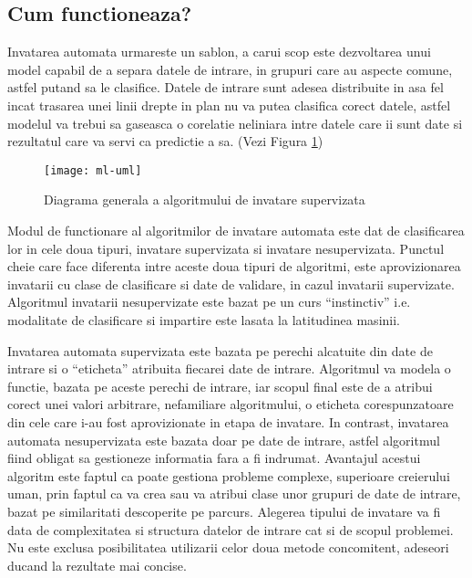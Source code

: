 	
	\subsection{Cum functioneaza?}
	Invatarea automata urmareste un sablon, a carui scop este dezvoltarea unui model capabil de a separa datele de intrare, in grupuri care au aspecte comune, astfel putand sa le clasifice. Datele de intrare sunt adesea distribuite in asa fel incat trasarea unei linii drepte in plan nu va putea clasifica corect datele, astfel  modelul va trebui sa gaseasca o corelatie neliniara intre datele care ii sunt date si rezultatul care va servi ca predictie a sa. (Vezi Figura \ref{fig:uml-diagram})
	

	
	\begin{figure}[H]
		\texttt{[image: ml-uml]}  
		\caption{\label{fig:uml-diagram} Diagrama generala a algoritmului de invatare supervizata
		\protect
		\footnotemark}
	\end{figure}


	\newpage
	
	Modul de functionare al algoritmilor de invatare automata este dat de clasificarea lor in cele doua tipuri, invatare supervizata si invatare nesupervizata. Punctul cheie care face diferenta intre aceste doua tipuri de algoritmi, este aprovizionarea invatarii cu clase de clasificare si date de validare, in cazul invatarii supervizate. Algoritmul invatarii nesupervizate este bazat pe un curs “instinctiv” i.e. modalitate de clasificare si impartire este lasata la latitudinea masinii.
	
	Invatarea automata supervizata este bazata pe perechi alcatuite din date de intrare si o “eticheta” atribuita fiecarei date de intrare. Algoritmul va modela o functie, bazata pe aceste perechi de intrare, iar scopul final este de a atribui corect unei valori arbitrare, nefamiliare algoritmului, o eticheta corespunzatoare din cele care i-au fost aprovizionate in etapa de invatare. 
	In contrast, invatarea automata nesupervizata este bazata doar pe date de intrare, astfel algoritmul fiind obligat sa gestioneze informatia fara a fi indrumat. Avantajul acestui algoritm este faptul ca poate gestiona probleme complexe, superioare creierului uman, prin faptul ca va crea sau va atribui clase unor grupuri de date de intrare, bazat pe similaritati descoperite pe parcurs.
	Alegerea tipului de invatare va fi data de complexitatea si structura  datelor de intrare cat si de scopul problemei. Nu este exclusa posibilitatea utilizarii celor doua metode concomitent, adeseori ducand la rezultate mai concise.
	
